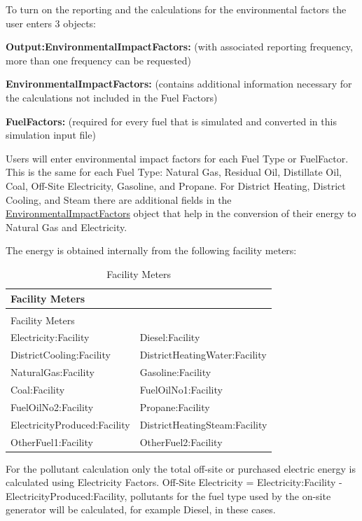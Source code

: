 To turn on the reporting and the calculations for the environmental factors the user enters 3 objects:

\textbf{Output:EnvironmentalImpactFactors:} (with associated reporting frequency, more than one frequency can be requested)

\textbf{EnvironmentalImpactFactors:} (contains additional information necessary for the calculations not included in the Fuel Factors)

\textbf{FuelFactors:} (required for every fuel that is simulated and converted in this simulation input file)

Users will enter environmental impact factors for each Fuel Type or FuelFactor. This is the same for each Fuel Type: Natural Gas, Residual Oil, Distillate Oil, Coal, Off-Site Electricity, Gasoline, and Propane. For District Heating, District Cooling, and Steam there are additional fields in the \hyperref[environmentalimpactfactors]{EnvironmentalImpactFactors} object that help in the conversion of their energy to Natural Gas and Electricity.

The energy is obtained internally from the following facility meters:

\begin{longtable}[c]{@{}ll@{}}
	\caption{Facility Meters \label{table:facility-meters}} \tabularnewline
	\toprule
	Facility Meters & \tabularnewline
	\midrule
	\endfirsthead

	\caption[]{Facility Meters} \tabularnewline
	\toprule
	Facility Meters & \tabularnewline
	\midrule
	\endhead

	Electricity:Facility & Diesel:Facility \tabularnewline
	DistrictCooling:Facility & DistrictHeatingWater:Facility \tabularnewline
	NaturalGas:Facility & Gasoline:Facility \tabularnewline
	Coal:Facility & FuelOilNo1:Facility \tabularnewline
	FuelOilNo2:Facility & Propane:Facility \tabularnewline
	ElectricityProduced:Facility & DistrictHeatingSteam:Facility \tabularnewline
	OtherFuel1:Facility & OtherFuel2:Facility \tabularnewline
	\bottomrule
\end{longtable}

For the pollutant calculation only the total off-site or purchased electric energy is calculated using Electricity Factors. Off-Site Electricity = Electricity:Facility - ElectricityProduced:Facility, pollutants for the fuel type used by the on-site generator will be calculated, for example Diesel, in these cases.

